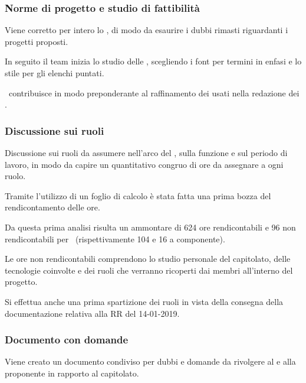             \subsubsection{Norme di progetto e studio di fattibilità}
            Viene corretto per intero lo \SdFd, di modo da esaurire i dubbi rimasti riguardanti i progetti proposti.\par
            In seguito il team inizia lo studio delle \NdPd, scegliendo i font per termini in enfasi e lo stile per gli elenchi puntati.\par
            \TG\ contribuisce in modo preponderante al raffinamento dei  usati nella redazione dei .

            \subsubsection{Discussione sui ruoli}
            Discussione sui ruoli da assumere nell'arco del , sulla funzione e sul periodo di lavoro, in modo da capire un quantitativo congruo di ore da assegnare a ogni ruolo.\par
            Tramite l'utilizzo di un foglio di calcolo è stata fatta una prima bozza del rendicontamento delle ore.\par
Da questa prima analisi risulta un ammontare di 624 ore rendicontabili e 96 non rendicontabili per \gruppo\ (rispettivamente 104 e 16 a componente).\par
Le ore non rendicontabili comprendono lo studio personale del capitolato, delle tecnologie coinvolte e dei ruoli che verranno ricoperti dai membri all'interno del progetto.\par
Si effettua anche una prima spartizione dei ruoli in vista della consegna della documentazione relativa alla RR del 14-01-2019.\par

            \subsubsection{Documento con domande}
            Viene creato un documento condiviso per dubbi e domande da rivolgere al {\TV} e alla proponente {\II} in rapporto al capitolato.\par


